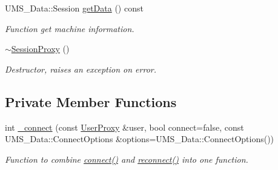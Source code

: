 \begin{DoxyCompactItemize}
UMS\_\-Data::Session \hyperlink{classSessionProxy_aab4736beb92fb8096d3ed406306677f7}{getData} () const 
\begin{DoxyCompactList}\small\item\em Function get machine information. \item\end{DoxyCompactList}\item 
\hypertarget{classSessionProxy_a368db89c311f83634e33086e3056946f}{
\hyperlink{classSessionProxy_a368db89c311f83634e33086e3056946f}{$\sim$SessionProxy} ()}
\label{classSessionProxy_a368db89c311f83634e33086e3056946f}

\begin{DoxyCompactList}\small\item\em Destructor, raises an exception on error. \item\end{DoxyCompactList}\end{DoxyCompactItemize}
\subsection*{Private Member Functions}
\begin{DoxyCompactItemize}
\item 
int \hyperlink{classSessionProxy_a0c01780ee2b6f4e313823022a6633d3c}{\_\-connect} (const \hyperlink{classUserProxy}{UserProxy} \&user, bool connect=false, const UMS\_\-Data::ConnectOptions \&options=UMS\_\-Data::ConnectOptions())
\begin{DoxyCompactList}\small\item\em Function to combine \hyperlink{classSessionProxy_a43aac256a75c6edafc54a796e149a2f0}{connect()} and \hyperlink{classSessionProxy_ac76a2d9a40b86bbe3ce28f77bc7c63ae}{reconnect()} into one function. \item\end{DoxyCompactList}\end{DoxyCompactItemize}
